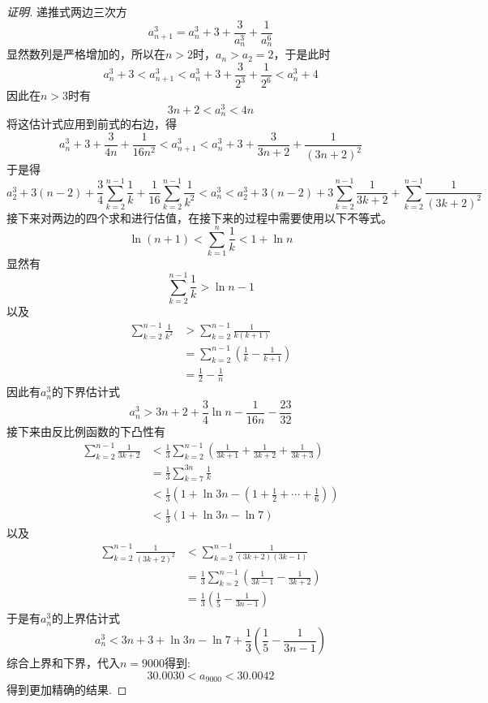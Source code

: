 \begin{proof}[证明]
  递推式两边三次方
  \[ a_{n+1}^3 = a_n^3 + 3 + \frac{3}{a_n^3} + \frac{1}{a_n^6} \]
  显然数列是严格增加的，所以在$n>2$时，$a_n>a_2=2$，于是此时
  \[ a_n^3+3 < a_{n+1}^3 < a_n^3 + 3 + \frac{3}{2^3}+\frac{1}{2^6}<a_n^3+4 \]
  因此在$n>3$时有
  \[ 3n+2<a_n^3<4n \]
  将这估计式应用到前式的右边，得
  \[ a_n^3 + 3 + \frac{3}{4n} + \frac{1}{16n^2} < a_{n+1}^3 < a_n^3 + 3 + \frac{3}{3n+2} + \frac{1}{(3n+2)^2} \]
  于是得
  \[ a_2^3 + 3(n-2) + \frac{3}{4}\sum_{k=2}^{n-1} \frac{1}{k} + \frac{1}{16}\sum_{k=2}^{n-1} \frac{1}{k^2} < a_n^3 < a_2^3 + 3(n-2) + 3\sum_{k=2}^{n-1} \frac{1}{3k+2} + \sum_{k=2}^{n-1} \frac{1}{(3k+2)^2} \]
 接下来对两边的四个求和进行估值，在接下来的过程中需要使用以下不等式。
  \[ \ln{(n+1)} < \sum_{k=1}^n \frac{1}{k} < 1 + \ln{n} \]
  显然有
    \[ \sum_{k=2}^{n-1} \frac{1}{k} > \ln{n} - 1 \]
    以及
    \begin{align*}
      \sum_{k=2}^{n-1} \frac{1}{k^2} & > \sum_{k=2}^{n-1} \frac{1}{k(k+1)} \\
                                     & = \sum_{k=2}^{n-1} \left( \frac{1}{k} - \frac{1}{k+1} \right) \\
      & = \frac{1}{2} - \frac{1}{n}
    \end{align*}
    因此有$a_n^3$的下界估计式
    \[ a_n^3 > 3n+2+\frac{3}{4} \ln{n} -\frac{1}{16n} - \frac{23}{32} \]
    接下来由反比例函数的下凸性有
  \begin{align*}
    \sum_{k=2}^{n-1} \frac{1}{3k+2} & < \frac{1}{3} \sum_{k=2}^{n-1} \left( \frac{1}{3k+1} + \frac{1}{3k+2} + \frac{1}{3k+3} \right) \\
                                & = \frac{1}{3} \sum_{k=7}^{3n} \frac{1}{k} \\
                                    & < \frac{1}{3} \left( 1+\ln{3n} - \left( 1+\frac{1}{2}+\cdots+\frac{1}{6} \right) \right) \\
    & < \frac{1}{3} \left( 1+\ln{3n} - \ln{7} \right)
  \end{align*}
  以及
  \begin{align*}
    \sum_{k=2}^{n-1} \frac{1}{(3k+2)^2} & < \sum_{k=2}^{n-1} \frac{1}{(3k+2)(3k-1)} \\
                                        & = \frac{1}{3} \sum_{k=2}^{n-1} \left( \frac{1}{3k-1} - \frac{1}{3k+2} \right) \\
    & = \frac{1}{3} \left( \frac{1}{5} - \frac{1}{3n-1} \right)
  \end{align*}
  于是有$a_n^3$的上界估计式
  \[ a_n^3 < 3n+3 +\ln{3n} - \ln{7} + \frac{1}{3} \left( \frac{1}{5} - \frac{1}{3n-1} \right) \]
  综合上界和下界，代入$n=9000$得到:
  \[ 30.0030 < a_{9000} < 30.0042 \]
 得到更加精确的结果.
 \end{proof}


